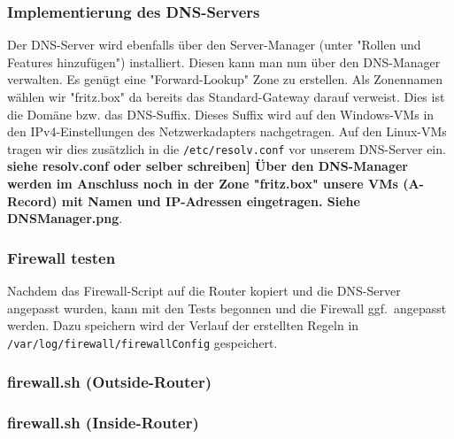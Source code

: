 \subsubsection{Implementierung des DNS-Servers}
Der DNS-Server wird ebenfalls über den Server-Manager (unter "Rollen und Features hinzufügen") installiert. Diesen kann man nun über den DNS-Manager verwalten. Es genügt eine "Forward-Lookup" Zone zu erstellen. Als Zonennamen wählen wir "fritz.box" da bereits das Standard-Gateway darauf verweist. Dies ist die Domäne bzw. das DNS-Suffix. Dieses Suffix wird auf den Windows-VMs in den IPv4-Einstellungen des Netzwerkadapters nachgetragen. Auf den Linux-VMs tragen wir dies zusätzlich in die \verb+/etc/resolv.conf+ vor unserem DNS-Server ein. \textbf{siehe resolv.conf oder selber schreiben]
Über den DNS-Manager werden im Anschluss noch in der Zone "fritz.box" unsere VMs (A-Record) mit Namen und IP-Adressen eingetragen. \textbf Siehe DNSManager.png}.
\subsubsection{Firewall testen}
Nachdem das Firewall-Script auf die Router kopiert und die DNS-Server angepasst wurden, kann mit den Tests begonnen und die Firewall ggf.\ angepasst werden. Dazu speichern wird der Verlauf der erstellten Regeln in \verb+/var/log/firewall/firewallConfig+ gespeichert.

\subsubsection{firewall.sh (Outside-Router)}


\subsubsection{firewall.sh (Inside-Router)}

